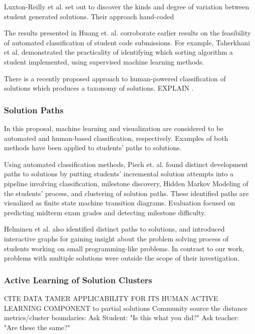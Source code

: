 \documentclass[12pt]{article}
\begin{document}
Luxton-Reilly et al. \cite{Luxton13} set out to discover the kinds and degree of variation between student generated solutions. Their approach hand-coded 

The results presented in Huang et. al. corroborate earlier results on the feasibility of automated classification of student code submissions. For example, Taherkhani et al. \cite{taherkhani12} demonstrated the practicality of identifying which sorting algorithm a student implemented, using supervised machine learning methods.


There is a recently proposed approach to human-powered classification of solutions which produces a taxonomy of solutions. EXPLAIN .

\subsubsection{Solution Paths}

In this proposal, machine learning and visualization are considered to be automated and human-based classification, respectively. Examples of both methods have been applied to students' paths to solutions.

Using automated classification methods, Piech et. al. \cite{Piech} found distinct development paths to solutions by putting students' incremental solution attempts into a pipeline involving classification, milestone discovery, Hidden Markov Modeling of the students' process, and clustering of solution paths. These identified paths are visualized as finite state machine transition diagrams. Evaluation focused on predicting midterm exam grades and detecting milestone difficulty.

Helminen et al. \cite{ICERHelminen} also identified distinct paths to solutions, and introduced interactive graphs for gaining insight about the problem solving process of students working on small programming-like problems. In contrast to our work, problems with multiple solutions were outside the scope of their investigation.



\subsubsection{Active Learning of Solution Clusters}

CITE DATA TAMER APPLICABILITY FOR ITS HUMAN ACTIVE LEARNING COMPONENT to partial solutions
Community source the distance metrics/cluster boundaries: Ask Student: "Is this what you did?" Ask teacher: "Are these the same?"
\end{document}
